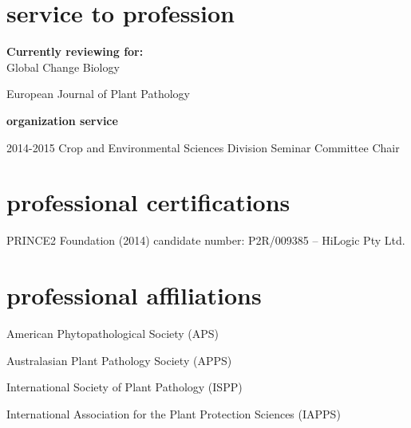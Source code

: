 \section{service to profession}
\textbf{Currently reviewing for:}\\
Global Change Biology

European Journal of Plant Pathology


\textbf{organization service}\\
\begin{entrylist}
  \entry
	{2014-2015}
	{Crop and Environmental Sciences Division Seminar Committee Chair}
	{}
	{}
\end{entrylist}
\section{professional certifications}
PRINCE2 Foundation (2014) candidate number: P2R/009385 – HiLogic  Pty Ltd.

\section{professional affiliations}
American Phytopathological Society (APS)

Australasian Plant Pathology Society (APPS) 

International Society of Plant Pathology (ISPP)

International Association for the Plant Protection Sciences (IAPPS)